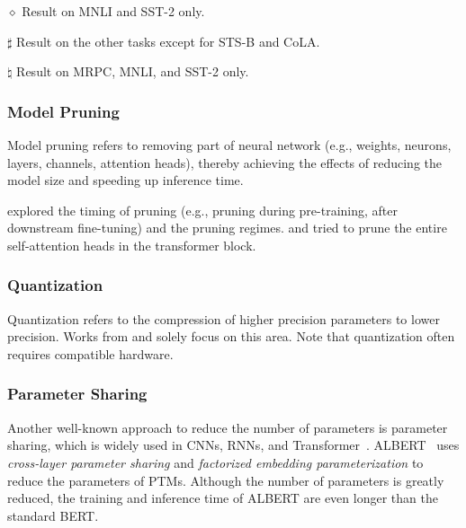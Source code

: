 \documentclass[fleqn]{SCYE-arxiv}
\begin{document}
\begin{multicols}{2}
\begin{table*}[t]
\begin{threeparttable}
\begin{tablenotes}
\item[$\diamond$] Result on MNLI and SST-2 only.
\item[$\sharp$] Result on the other tasks except for STS-B and CoLA.
 \item[$\natural$] Result on MRPC, MNLI, and SST-2 only.
\end{tablenotes}
 \end{threeparttable}
 \end{table*}


\subsubsection{Model Pruning}

Model pruning refers to removing part of neural network (e.g., weights, neurons, layers, channels, attention heads), thereby achieving the effects of reducing the model size and speeding up inference time.

\citet{gordon2020compressing} explored the timing of pruning (e.g., pruning during pre-training, after downstream fine-tuning) and the pruning regimes. \citet{michel2019sixteen} and \citet{voita-etal-2019-analyzing} tried to prune the entire self-attention heads in the transformer block.

\subsubsection{Quantization}
Quantization refers to the compression of higher precision parameters to lower precision. Works from \citet{shen2020q} and \citet{zafrir2019q8bert} solely focus on this area. Note that quantization often requires compatible hardware.

\subsubsection{Parameter Sharing}
Another well-known approach to reduce the number of parameters is parameter sharing, which is widely used in CNNs, RNNs, and Transformer~\cite{DBLP:conf/iclr/DehghaniGVUK19}.
ALBERT~\cite{lan2019albert} uses \textit{cross-layer parameter sharing} and \textit{factorized embedding parameterization}  to reduce the parameters of PTMs. Although the number of parameters is greatly reduced, the training and inference time of ALBERT are even longer than the standard BERT.


\end{multicols}
\end{document}
